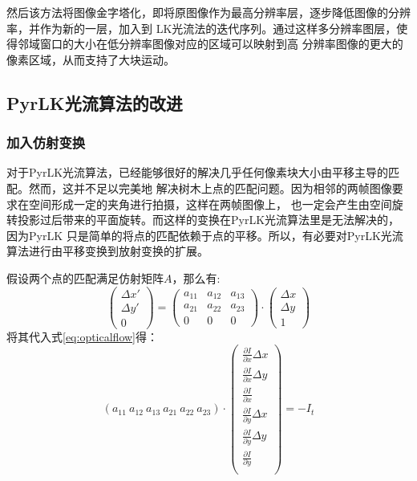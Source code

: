 然后该方法将图像金字塔化，即将原图像作为最高分辨率层，逐步降低图像的分辨率，并作为新的一层，加入到
LK光流法的迭代序列。通过这样多分辨率图层，使得邻域窗口的大小在低分辨率图像对应的区域可以映射到高
分辨率图像的更大的像素区域，从而支持了大块运动。

\subsection{PyrLK光流算法的改进}
\label{subsec:revisedpyrlk}
\subsubsection{加入仿射变换}
对于PyrLK光流算法，已经能够很好的解决几乎任何像素块大小由平移主导的匹配。然而，这并不足以完美地
解决树木上点的匹配问题。因为相邻的两帧图像要求在空间形成一定的夹角进行拍摄，这样在两帧图像上，
也一定会产生由空间旋转投影过后带来的平面旋转。而这样的变换在PyrLK光流算法里是无法解决的，因为PyrLK
只是简单的将点的匹配依赖于点的平移。所以，有必要对PyrLK光流算法进行由平移变换到放射变换的扩展。

假设两个点的匹配满足仿射矩阵$A$，那么有:\\
\begin{equation}
	\left(
	\begin{array}{c}
		\Delta x'\\
		\Delta y'\\
		0
	\end{array}
	\right)
	=
	\left(
	\begin{array}{ccc}
		a_{11} & a_{12} & a_{13}\\
		a_{21} & a_{22} & a_{23}\\
				0 & 0 & 0
	\end{array}
	\right)
	\cdot
	\left(
	\begin{array}{c}
		\Delta x\\
		\Delta y\\
		1
	\end{array}
	\right)
\end{equation}
将其代入式\ref{eq:opticalflow}得：\\
\begin{equation}
	(a_{11}\ a_{12}\ a_{13}\ a_{21}\ a_{22}\ a_{23})\cdot
	\left(
	\begin{array}{c}
		\frac{\partial I}{\partial x}\Delta x\\
        \frac{\partial I}{\partial x}\Delta y\\
        \frac{\partial I}{\partial x}\\
        \frac{\partial I}{\partial y}\Delta x\\
        \frac{\partial I}{\partial y}\Delta y\\
        \frac{\partial I}{\partial y}\\
	\end{array}
	\right)
	=-I_t
\end{equation}

